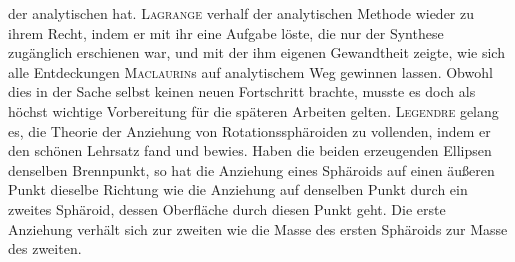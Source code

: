 der analytischen hat. \textsc{Lagrange} verhalf der analytischen Methode wieder zu ihrem Recht, indem er mit ihr eine Aufgabe löste, die nur der Synthese zugänglich erschienen war, und mit der ihm eigenen Gewandtheit zeigte, wie sich alle Entdeckungen \textsc{Maclaurin}s auf analytischem Weg gewinnen lassen. Obwohl dies in der Sache selbst keinen neuen Fortschritt brachte, musste es doch als höchst wichtige Vorbereitung für die späteren Arbeiten gelten. \textsc{Legendre} gelang es, die Theorie der Anziehung von Rotationssphäroiden zu vollenden, indem er den schönen Lehrsatz fand und bewies. Haben die beiden erzeugenden Ellipsen denselben Brennpunkt, so hat die Anziehung eines Sphäroids auf einen äußeren Punkt dieselbe Richtung wie die Anziehung auf denselben Punkt durch ein zweites Sphäroid, dessen Oberfläche durch diesen Punkt geht. Die erste Anziehung verhält sich zur zweiten wie die Masse des ersten Sphäroids zur Masse des zweiten.

